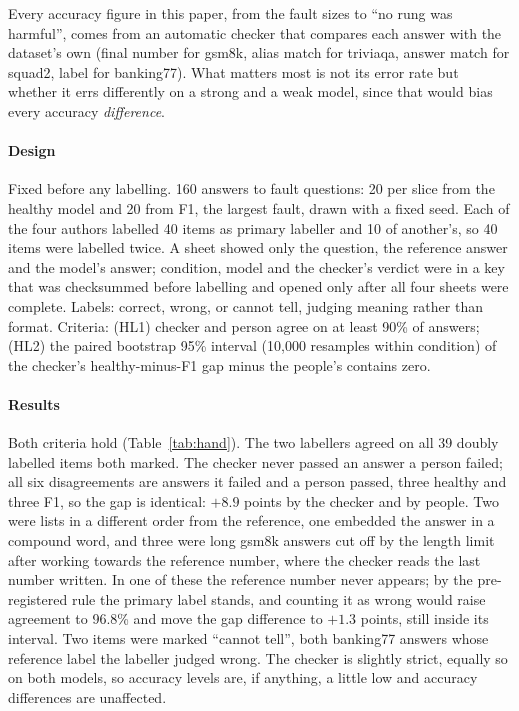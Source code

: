 \documentclass{article}
\begin{document}
Every accuracy figure in this paper, from the fault sizes to ``no rung was
harmful'', comes from an automatic checker that compares each answer with the
dataset's own (final number for \textsf{gsm8k}, alias match for \textsf{triviaqa},
answer match for \textsf{squad2}, label for \textsf{banking77}). What matters most
is not its error rate but whether it errs differently on a strong and a weak model,
since that would bias every accuracy \emph{difference}.

\paragraph{Design} Fixed before any labelling. 160 answers to fault questions:
20 per slice from the healthy model and 20 from F1, the largest fault, drawn with
a fixed seed. Each of the four authors labelled 40 items as primary labeller and
10 of another's, so 40 items were labelled twice. A sheet showed only the
question, the reference answer and the model's answer; condition, model and the
checker's verdict were in a key that was checksummed before labelling and opened
only after all four sheets were complete. Labels: correct, wrong, or cannot tell,
judging meaning rather than format. Criteria: (HL1) checker and person agree on at
least 90\% of answers; (HL2) the paired bootstrap 95\% interval (10{,}000
resamples within condition) of the checker's healthy-minus-F1 gap minus the
people's contains zero.

\paragraph{Results} Both criteria hold (Table~\ref{tab:hand}). The two labellers
agreed on all 39 doubly labelled items both marked. The checker never passed an
answer a person failed; all six disagreements are answers it failed and a person
passed, three healthy and three F1, so the gap is identical: $+8.9$ points by the
checker and by people. Two were lists in a different order from the reference,
one embedded the answer in a compound word, and three were long \textsf{gsm8k}
answers cut off by the length limit after working towards the reference number,
where the checker reads the last number written. In one of these the reference
number never appears; by the pre-registered rule the primary label stands, and
counting it as wrong would raise agreement to 96.8\% and move the gap difference to
$+1.3$ points, still inside its interval. Two items were marked ``cannot tell'',
both \textsf{banking77} answers whose reference label the labeller judged wrong.
The checker is slightly strict, equally so on both models, so accuracy levels
are, if anything, a little low and accuracy differences are unaffected.
\end{document}
